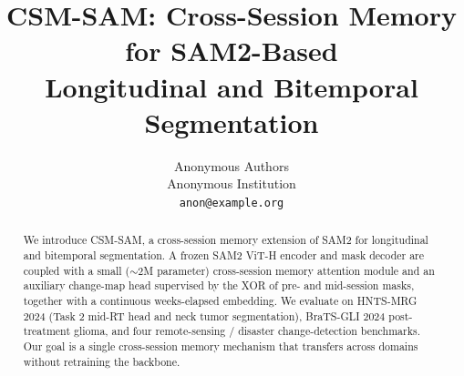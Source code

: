 \documentclass{article}
\title{CSM-SAM: Cross-Session Memory for SAM2-Based\\Longitudinal and Bitemporal Segmentation}
\author{%
  Anonymous Authors\\
  Anonymous Institution\\
  \texttt{anon@example.org}
}
\begin{document}
\maketitle

\begin{abstract}
We introduce CSM-SAM, a cross-session memory extension of SAM2 for longitudinal and bitemporal segmentation. A frozen SAM2 ViT-H encoder and mask decoder are coupled with a small ($\sim$2M parameter) cross-session memory attention module and an auxiliary change-map head supervised by the XOR of pre- and mid-session masks, together with a continuous weeks-elapsed embedding. We evaluate on HNTS-MRG 2024 (Task 2 mid-RT head and neck tumor segmentation), BraTS-GLI 2024 post-treatment glioma, and four remote-sensing / disaster change-detection benchmarks. Our goal is a single cross-session memory mechanism that transfers across domains without retraining the backbone.
\end{abstract}












\end{document}
